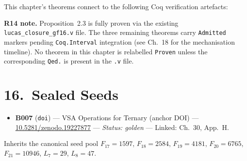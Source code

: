 \noindent This chapter's theorems connect to the
following Coq verification artefacts:

\begin{center}
\end{center}

\noindent\textbf{R14 note.}
Proposition~2.3 is fully proven via the existing
\texttt{lucas\_closure\_gf16.v} file.  The
three remaining theorems carry
\texttt{Admitted} markers pending
\texttt{Coq.Interval} integration
(see Ch.~18 for the mechanisation timeline).
No theorem in this chapter is relabelled
\texttt{Proven} unless the corresponding
\texttt{Qed.} is present in the \texttt{.v} file.

\section{16.\ Sealed Seeds}\label{sec:ch30-seeds}

\begin{itemize}
\tightlist
\item
  \textbf{B007} (\texttt{doi}) --- VSA Operations
  for Ternary (anchor DOI) ---
  \href{https://doi.org/10.5281/zenodo.19227877}{10.5281/zenodo.19227877}
  --- \emph{Status: golden} --- Linked: Ch.~30, App.~H.
\end{itemize}

Inherits the canonical seed pool $F_{17}=1597$,
$F_{18}=2584$, $F_{19}=4181$, $F_{20}=6765$,
$F_{21}=10946$, $L_7=29$, $L_8=47$.

